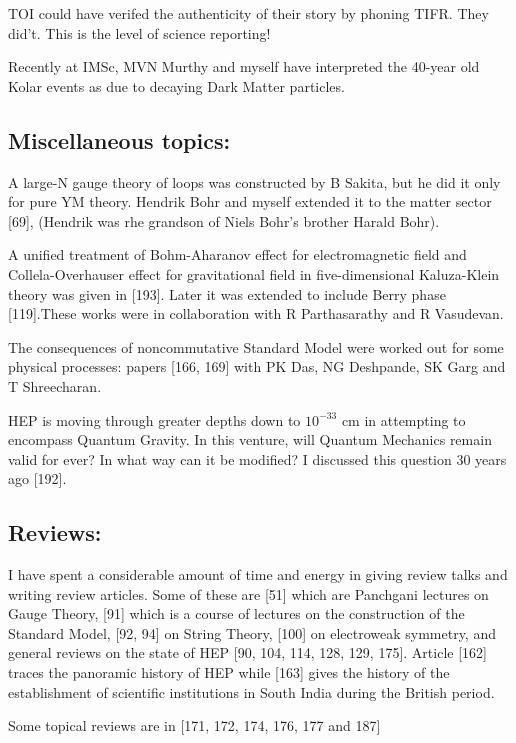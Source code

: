 TOI could have verifed the authenticity of their story by phoning TIFR. 
They did't. This is the level of science reporting!

Recently at IMSc, MVN Murthy and myself have interpreted the 40-year old 
Kolar events as due to decaying Dark Matter particles.

\subsection*{Miscellaneous topics:}

A large-N gauge theory of loops was constructed by B Sakita, but he did 
it only for pure YM theory. Hendrik Bohr and myself extended it to the 
matter sector [69], (Hendrik was rhe grandson of Niels Bohr's brother 
Harald Bohr).
\smallskip

A unified treatment of Bohm-Aharanov effect for electromagnetic field 
and Collela-Overhauser effect for gravitational field in 
five-dimensional Kaluza-Klein theory was given in [193]. Later it was 
extended to include Berry phase [119].These works were in collaboration 
with R Parthasarathy and R Vasudevan.
\smallskip

The consequences of noncommutative Standard Model were worked out for 
some physical processes: papers [166, 169] with PK Das, NG Deshpande, SK 
Garg and T Shreecharan.
\smallskip

HEP is moving through greater depths down to $10^{-33}$ cm in attempting 
to encompass Quantum Gravity. In this venture, will Quantum Mechanics 
remain valid for ever? In what way can it be modified? I discussed this 
question 30 years ago [192].

\subsection*{Reviews:}

I have spent a considerable amount of time and energy in giving review 
talks and writing review articles. Some of these are [51] which are 
Panchgani lectures on Gauge Theory, [91] which is a course of lectures 
on the construction of the Standard Model, [92, 94] on String Theory, 
[100] on electroweak symmetry, and general reviews on the state of HEP 
[90, 104, 114, 128, 129, 175]. Article [162] traces the panoramic history of 
HEP while [163] gives the history of the establishment of scientific 
institutions in South India during the British period.

Some topical reviews are in [171, 172, 174, 176, 177 and 187]

